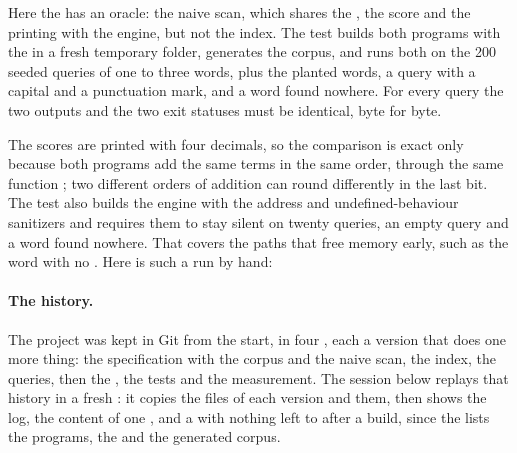 Here the  has an oracle: the naive scan, which shares the , the score and the printing with
the engine, but not the index. The test builds both programs with the  in a fresh temporary folder, generates
the corpus, and runs both on the 200 seeded queries of one to three words, plus the planted words, a query with a
capital and a punctuation mark, and a word found nowhere. For every query the two outputs and the two exit statuses
must be identical, byte for byte.

\label{lst:b1:project-text-search-engine:e2e}

The scores are printed with four decimals, so the comparison is exact only because both programs add the same
terms in the same order, through the same function ; two different orders of addition can round
differently in the last bit. The test also builds the engine with the address and undefined-behaviour sanitizers and
requires them to stay silent on twenty queries, an empty query and a word found nowhere. That covers the paths that
free memory early, such as the word with no . Here is such a run by hand:

\label{out:b1:project-text-search-engine:asan}

\label{out:b1:project-text-search-engine:status}

\paragraph{The history.} The project was kept in Git from the start, in four , each a version that does one
more thing: the specification with the corpus and the naive scan, the index, the queries, then the , the tests
and the measurement. The session below replays that history in a fresh : it copies
the files of each version and  them, then shows the log, the content of one , and a  with
nothing left to  after a build, since the  lists the programs, the  and the
generated corpus.


